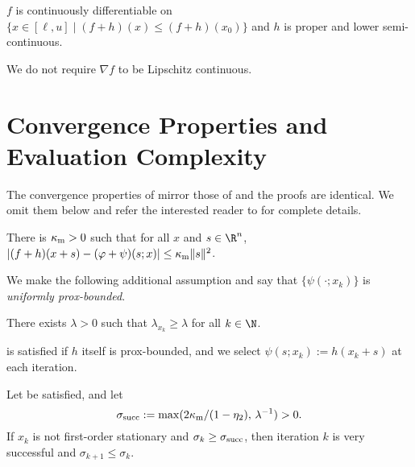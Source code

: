 \documentclass[smallextended]{svjour3}       %
\begin{document}
\begin{problemassumption}%
  \label{asm:g-lipschitz}
  \(f\) is continuously differentiable on \(\{x \in [\ell, u] \mid (f+h)(x) \leq (f+h)(x_0)\}\) and \(h\) is proper and lower semi-continuous.
\end{problemassumption}

\begin{remark}
  We do not require \(\nabla f\) to be Lipschitz continuous.
\end{remark}

\section{Convergence Properties and Evaluation Complexity}%
\label{sec:convergence}

The convergence properties of  mirror those of \citep[Algorithm~\(4.1\)]{aravkin-baraldi-orban-2022b} and the proofs are identical.
We omit them below and refer the interested reader to \citep{aravkin-baraldi-orban-2022b} for complete details.

\begin{modelassumption}%
  \label{asm:model-adequacy}
  There is \(\kappa_{\textup{m}} > 0\) such that for all \(x\) and \(s \in \R^n\), \(|(f + h)(x + s) - (\varphi +
\psi)(s; x)| \leq \kappa_{\textup{m}} \|s\|^2\).
\end{modelassumption}

We make the following additional assumption and say that \(\{\psi(\cdot; x_k)\}\) is \emph{uniformly prox-bounded}.

\begin{modelassumption}%
  \label{asm:unif-prox-bounded}
  There exists \(\lambda > 0\) such that \(\lambda_{x_k} \geq \lambda\) for all \(k \in \N\).
\end{modelassumption}

 is satisfied if \(h\) itself is prox-bounded, and we select \(\psi(s; x_k) := h(x_k + s)\) at each iteration.

\begin{theorem}%
  \label{thm:sigmasucc}
  Let  be satisfied, and let
  \begin{equation}
    \label{eq:def-sigmasucc}
    \sigma_{\textup{succ}} :=
    \max(2 \kappa_{\textup{m}} / (1 - \eta_2), \, \lambda^{-1})
     > 0.
  \end{equation}
  If \(x_k\) is not first-order stationary and
  \(
    \sigma_k \geq \sigma_{\textup{succ}}
  \),
  then iteration \(k\) is very successful and
  \(
    \sigma_{k+1} \leq \sigma_k
  \).
\end{theorem}
\end{document}
